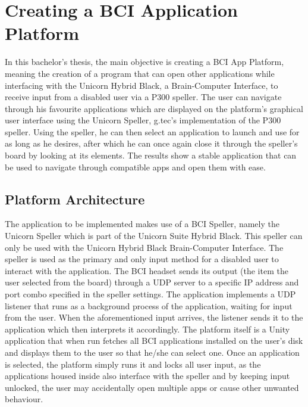 
\chapter{Creating a BCI Application Platform}\label{cap:development}
In this bachelor's thesis, the main objective is creating a BCI App Platform, meaning the creation of a program that can open other applications while interfacing with the Unicorn Hybrid Black, a Brain-Computer Interface, to receive input from a disabled user via a P300 speller. The user can navigate through his favourite applications which are displayed on the platform's graphical user interface using the Unicorn Speller, g.tec's implementation of the P300 speller. Using the speller, he can then select an application to launch and use for as long as he desires, after which he can once again close it through the speller's board by looking at its elements. The results show a stable application that can be used to navigate through compatible apps and open them with ease.

\section{Platform Architecture}
The application to be implemented makes use of a BCI Speller, namely the Unicorn Speller which is part of the Unicorn Suite Hybrid Black. This speller can only be used with the Unicorn Hybrid Black Brain-Computer Interface. The speller is used as the primary and only input method for a disabled user to interact with the application. The BCI headset sends its output (the item the user selected from the board) through a UDP server to a specific IP address and port combo specified in the speller settings. The application implements a UDP listener that runs as a background process of the application, waiting for input from the user. When the aforementioned input arrives, the listener sends it to the application which then interprets it accordingly.
\vspace{\baselineskip}\newline
The platform itself is a Unity application that when run fetches all BCI applications installed on the user's disk and displays them to the user so that he/she can select one. Once an application is selected, the platform simply runs it and locks all user input, as the applications housed inside also interface with the speller and by keeping input unlocked, the user may accidentally open multiple apps or cause other unwanted behaviour.

